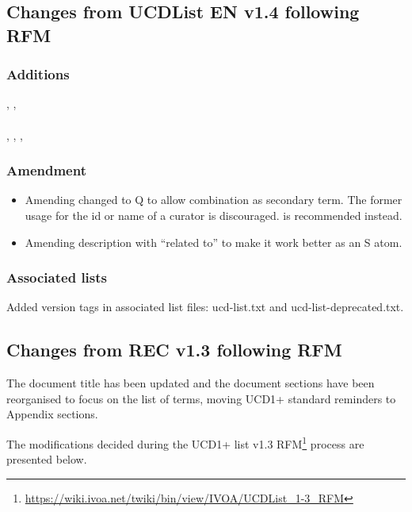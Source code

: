 \documentclass[11pt,a4paper]{ivoa}
\begin{document}
\subsection{Changes from UCDList EN v1.4 following RFM}
\subsubsection*{Additions}
, , \\
 \\
, , ,  \\

\subsubsection*{Amendment}
\begin{itemize}
\item Amending  changed to Q to allow combination as secondary term.
The former usage  for the id or name of a curator is
discouraged.  is recommended instead.
\item Amending  description with ``related to'' to make
it work better as an S atom.
\end{itemize}

\subsubsection*{Associated lists} 
Added version tags in associated list files: ucd-list.txt and ucd-list-deprecated.txt.
\subsection{Changes from REC v1.3 following RFM}
The document title has been updated and the document sections have been reorganised to focus on 
the list of terms, moving UCD1+ standard reminders to Appendix sections. 

The modifications decided during the UCD1+ list v1.3 
RFM\footnote{\url{https://wiki.ivoa.net/twiki/bin/view/IVOA/UCDList_1-3_RFM}} process are presented below.

\end{document}
